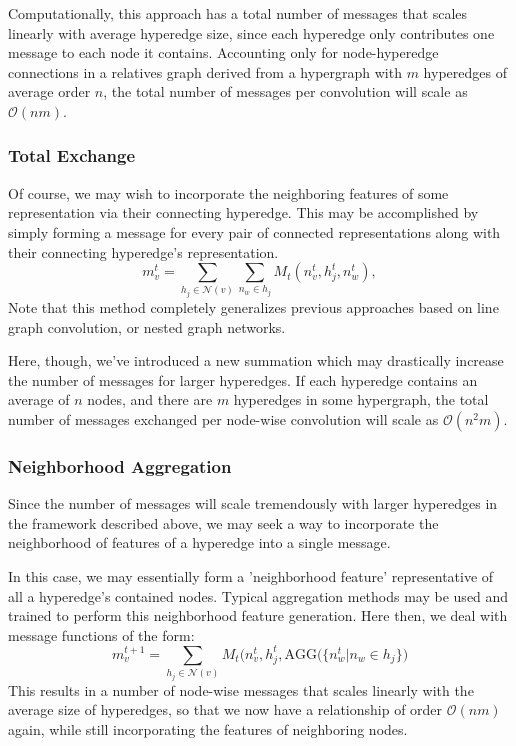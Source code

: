 \documentclass[10pt,a4paper]{article}
\begin{document}
Computationally, this approach has a total number of messages that scales linearly with average hyperedge size, since each hyperedge only contributes one message to each node it contains.
Accounting only for node-hyperedge connections in a relatives graph derived from a hypergraph with $m$ hyperedges of average order $n$, the total number of messages per convolution will scale as $\mathcal{O}(nm)$.
 
\subsubsection{Total Exchange}
Of course, we may wish to incorporate the neighboring features of some representation via their connecting hyperedge. This may be accomplished by simply forming a message for every pair of connected representations along with their connecting hyperedge's representation.
$$
m_v^{t} = \sum_{h_j\in \mathcal{N}(v)} \sum_{n_w \in h_j } M_t(n_v^{t},h_j^{t}, n_w^t),
$$
Note that this method completely generalizes previous approaches based on line graph convolution, or nested graph networks.

Here, though, we've introduced a new summation which may drastically increase the number of messages for larger hyperedges. If each hyperedge contains an average of $n$ nodes, and there are $m$ hyperedges in some hypergraph, the total number of messages exchanged per node-wise convolution will scale as $\mathcal{O}(n^2m)$.


\subsubsection{Neighborhood Aggregation}
Since the number of messages will scale tremendously with larger hyperedges in the framework described above, we may seek a way to incorporate the neighborhood of features of a hyperedge into a single message.

In this case, we may essentially form a 'neighborhood feature' representative of all a hyperedge's contained nodes. Typical aggregation methods may be used and trained to perform this neighborhood feature generation. Here then, we deal with message functions of the form:
$$
m_v^{t+1}=\sum_{h_j\in \mathcal{N}(v)} M_t(n_v^{t},h_j^{t},\text{AGG}\big(\lbrace n_w^t \vert n_w \in h_j \rbrace\big)
$$
This results in a number of node-wise messages that scales linearly with the average size of hyperedges, so that we now have a relationship of order $\mathcal{O}(nm)$ again, while still incorporating the features of neighboring nodes.
\end{document}

